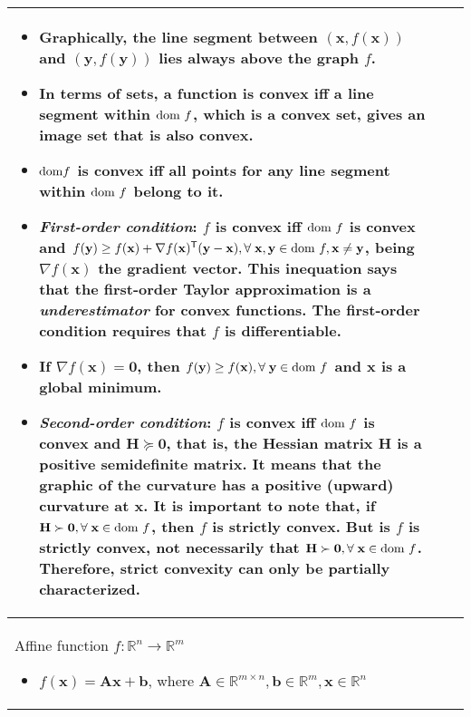 \documentclass{article}
\begin{document}
\begin{table}[ht!]
\begin{tabularx}{\textwidth}{|>{\setlength\hsize{1\hsize}\setlength\linewidth{\hsize}}X|>{\setlength\hsize{.9\hsize}\setlength\linewidth{\hsize}}X|>{\setlength\hsize{1.1\hsize}\setlength\linewidth{\hsize}}X|}
        \begin{itemize}[leftmargin=*]
            \item Graphically, the line segment between \((\mathbf{x}, f(\mathbf{x}))\) and \((\mathbf{y}, f(\mathbf{y}))\) lies always above the graph \(f\).
            \item In terms of sets, a function is convex iff a line segment within \(\textnormal{dom } f\), which is a convex set, gives an image set that is also convex.
            \item \(\textnormal{dom} f\) is convex iff all points for any line segment within \(\textnormal{dom } f\) belong to it.
            \item \emph{First-order condition}: \(f\) is convex iff \(\textnormal{dom } f\) is convex and \(f(\mathbf{y}) \geq f(\mathbf{x}) + \nabla f (\mathbf{x})^\mathsf{T} (\mathbf{y} - \mathbf{x}),\forall\;\mathbf{x},\mathbf{y} \in \textnormal{dom } f, \mathbf{x}\neq\mathbf{y}\), being \(\nabla f (\mathbf{x})\) the gradient vector. This inequation says that the first-order Taylor approximation is a \emph{underestimator} for convex functions. The first-order condition requires that \(f\) is differentiable.
            \item If \(\nabla f(\mathbf{x}) = \mathbf{0}\), then \(f(\mathbf{y})\geq f(\mathbf{x}),\forall\;\mathbf{y}\in\textnormal{dom }f\) and \(\mathbf{x}\) is a global minimum.
            \item \emph{Second-order condition}: \(f\) is convex iff \(\textnormal{dom } f\) is convex and \(\mathbf{H}\succeq \mathbf{0}\), that is, the Hessian matrix \(\mathbf{H}\) is a positive semidefinite matrix. It means that the graphic of the curvature has a positive (upward) curvature at \(\mathbf{x}\). It is important to note that, if \(\mathbf{H}\succ\mathbf{0}, \forall\; \mathbf{x} \in \textnormal{dom }f\), then \(f\) is strictly convex. But is \(f\) is strictly convex, not necessarily that \(\mathbf{H}\succ\mathbf{0},\forall\; \mathbf{x} \in \textnormal{dom }f\). Therefore, strict convexity can only be partially characterized.
        \end{itemize}\\
        \hline
        Affine function \(f: \mathbb{R}^n \rightarrow \mathbb{R}^m\)
        \begin{itemize}[leftmargin=*]
            \item $f(\mathbf{x}) = \mathbf{Ax} + \mathbf{b}$, where \(\mathbf{A} \in \mathbb{R}^{m\times n}, \mathbf{b} \in \mathbb{R}^{m}, \mathbf{x} \in \mathbb{R}^{n}\)

\end{itemize}
\end{tabularx}
\end{table}
\end{document}
